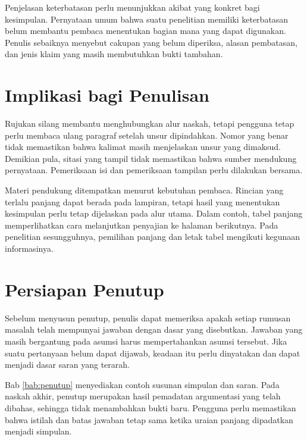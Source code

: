 Penjelasan keterbatasan perlu menunjukkan akibat yang konkret bagi kesimpulan. Pernyataan umum bahwa suatu penelitian memiliki keterbatasan belum membantu pembaca menentukan bagian mana yang dapat digunakan. Penulis sebaiknya menyebut cakupan yang belum diperiksa, alasan pembatasan, dan jenis klaim yang masih membutuhkan bukti tambahan.

\section{Implikasi bagi Penulisan}

Rujukan silang membantu menghubungkan alur naskah, tetapi pengguna tetap perlu membaca ulang paragraf setelah unsur dipindahkan. Nomor yang benar tidak memastikan bahwa kalimat masih menjelaskan unsur yang dimaksud. Demikian pula, sitasi yang tampil tidak memastikan bahwa sumber mendukung pernyataan. Pemeriksaan isi dan pemeriksaan tampilan perlu dilakukan bersama.

Materi pendukung ditempatkan menurut kebutuhan pembaca. Rincian yang terlalu panjang dapat berada pada lampiran, tetapi hasil yang menentukan kesimpulan perlu tetap dijelaskan pada alur utama. Dalam contoh, tabel panjang memperlihatkan cara melanjutkan penyajian ke halaman berikutnya. Pada penelitian sesungguhnya, pemilihan panjang dan letak tabel mengikuti kegunaan informasinya.

\section{Persiapan Penutup}

Sebelum menyusun penutup, penulis dapat memeriksa apakah setiap rumusan masalah telah mempunyai jawaban dengan dasar yang disebutkan. Jawaban yang masih bergantung pada asumsi harus mempertahankan asumsi tersebut. Jika suatu pertanyaan belum dapat dijawab, keadaan itu perlu dinyatakan dan dapat menjadi dasar saran yang terarah.

Bab \ref{bab:penutup} menyediakan contoh susunan simpulan dan saran. Pada naskah akhir, penutup merupakan hasil pemadatan argumentasi yang telah dibahas, sehingga tidak menambahkan bukti baru. Pengguna perlu memastikan bahwa istilah dan batas jawaban tetap sama ketika uraian panjang dipadatkan menjadi simpulan.
